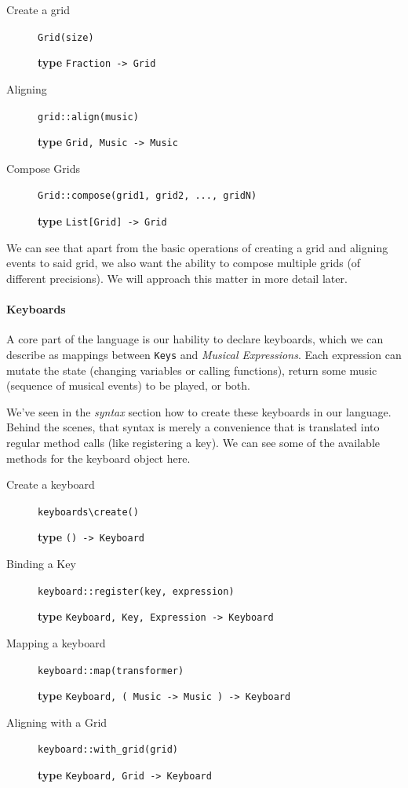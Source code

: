 \documentclass[a4paper,UKenglish,cleveref, autoref]{oasics-v2019}
\begin{document}
\begin{description}
    \item[Create a grid] \verb|Grid(size)|
    
        \textbf{type} \verb|Fraction -> Grid|
    \item[Aligning] \verb'grid::align(music)'
        
        \textbf{type} \verb|Grid, Music -> Music|
    \item[Compose Grids] \verb'Grid::compose(grid1, grid2, ..., gridN)'
        
        \textbf{type} \verb|List[Grid] -> Grid|
\end{description}

We can see that apart from the basic operations of creating a grid and aligning events to said grid, we also want the ability to compose multiple grids (of different precisions). We will approach this matter in more detail later.

\paragraph*{Keyboards}
A core part of the language is our hability to declare keyboards, which we can describe as mappings between \texttt{Keys} and \textit{Musical Expressions}. Each expression can mutate the state (changing variables or calling functions), return some music (sequence of musical events) to be played, or both.

We've seen in the \textit{syntax} section how to create these keyboards in our language. Behind the scenes, that syntax is merely a convenience that is translated into regular method calls (like registering a key). We can see some of the available methods for the keyboard object here.

\begin{description}
    \item[Create a keyboard] \verb|keyboards\create()|
    
        \textbf{type} \verb|() -> Keyboard|
    \item[Binding a Key] \verb'keyboard::register(key, expression)'
        
        \textbf{type} \verb|Keyboard, Key, Expression -> Keyboard|
    \item[Mapping a keyboard] \verb'keyboard::map(transformer)'
        
        \textbf{type} \verb|Keyboard, ( Music -> Music ) -> Keyboard|
    \item[Aligning with a Grid] \verb'keyboard::with_grid(grid)'
        
        \textbf{type} \verb|Keyboard, Grid -> Keyboard|    
\end{description}
\end{document}
